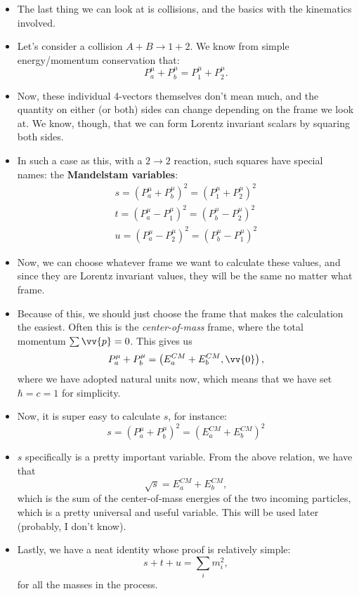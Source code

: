 \begin{itemize}
    \item The last thing we can look at is collisions, and the basics with the kinematics involved.
    \item Let's consider a collision $A+B \rightarrow 1+2$. We know from simple energy/momentum conservation that:
        \begin{equation}
            P^{\mu}_a + P^{\mu}_b = P^{\mu}_1 + P^{\mu}_2.
        \end{equation}
    \item Now, these individual 4-vectors themselves don't mean  much, and the quantity on either (or both) sides can change depending on the frame we look at. We know, though, that we can form Lorentz invariant scalars by squaring both sides.
    \item In such a case as this, with a $2\rightarrow2$ reaction, such squares have special names: the \textbf{Mandelstam variables}:
        \begin{gather}
            s = (P^{\mu}_a + P^{\mu}_b)^2 = (P^{\mu}_1 + P^{\mu}_2)^2 \\
            t = (P^{\mu}_a - P^{\mu}_1)^2 = (P^{\mu}_b - P^{\mu}_2)^2 \\
            u = (P^{\mu}_a - P^{\mu}_2)^2 = (P^{\mu}_b - P^{\mu}_1)^2
        \end{gather}
    \item Now, we can choose whatever frame we want to calculate these values, and since they are Lorentz invariant values, they will be the same no matter what frame.
    \item Because of this, we should just choose the frame that makes the calculation the easiest. Often this is the \textit{center-of-mass} frame, where the total momentum $\sum \vv{p} = 0$. This gives us
        \begin{equation}
            P^{\mu}_a + P^{\mu}_b = \left(E_a^{CM} + E_b^{CM}, \vv{0}\right),
        \end{equation}
        where we have adopted natural units now, which means that we have set $\hbar = c = 1$ for simplicity.
    \item Now, it is super easy to calculate $s$, for instance:
        \begin{equation}
            s = (P^{\mu}_a + P^{\mu}_b)^2 = (E_a^{CM} + E_b^{CM})^2
        \end{equation}
    \item $s$ specifically is a pretty important variable. From the above relation, we have that
        \begin{equation}
            \sqrt{s} = E_a^{CM} + E_b^{CM},
        \end{equation}
        which is the sum of the center-of-mass energies of the two incoming particles, which is a pretty universal and useful variable. This will be used later (probably, I don't know).
    \item Lastly, we have a neat identity whose proof is relatively simple:
        \begin{equation}
            s + t + u = \sum_i m_i^2,
        \end{equation}
        for all the masses in the process.
\end{itemize}
